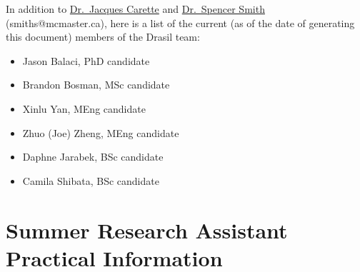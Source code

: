 \documentclass[12pt]{article}
\begin{document}
In addition to \href{https://www.cas.mcmaster.ca/~carette/} {Dr.\ Jacques
Carette} and \href{https://www.cas.mcmaster.ca/~smiths/} {Dr.\ Spencer Smith}
(smiths@mcmaster.ca), here is a list of the current (as of the date of
generating this document) members of the Drasil team:

\begin{itemize}
\item Jason Balaci, PhD candidate
\item Brandon Bosman, MSc candidate
\item Xinlu Yan, MEng candidate
\item Zhuo (Joe) Zheng, MEng candidate
\item Daphne Jarabek, BSc candidate
\item Camila Shibata, BSc candidate
\end{itemize}

\section{Summer Research Assistant Practical Information} \label{SecPractInfo}
\end{document}
